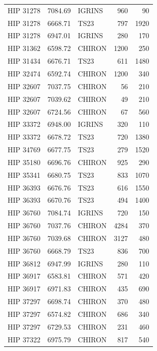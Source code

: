 {\begin{scriptsize}
\begin{longtable}{|l|rlrr|}
   HIP 31278 &  7084.69 &     IGRINS &      960 &    90 \\
   HIP 31278 &  6668.71 &       TS23 &      797 &  1920 \\
   HIP 31278 &  6947.01 &     IGRINS &      280 &   170 \\
   HIP 31362 &  6598.72 &     CHIRON &     1200 &   250 \\
   HIP 31434 &  6676.71 &       TS23 &      611 &  1480 \\
   HIP 32474 &  6592.74 &     CHIRON &     1200 &   340 \\
   HIP 32607 &  7037.75 &     CHIRON &       56 &   210 \\
   HIP 32607 &  7039.62 &     CHIRON &       49 &   210 \\
   HIP 32607 &  6724.56 &     CHIRON &       67 &   560 \\
   HIP 33372 &  6948.00 &     IGRINS &      320 &   110 \\
   HIP 33372 &  6678.72 &       TS23 &      720 &  1380 \\
   HIP 34769 &  6677.75 &       TS23 &      279 &  1520 \\
   HIP 35180 &  6696.76 &     CHIRON &      925 &   290 \\
   HIP 35341 &  6680.75 &       TS23 &      833 &  1070 \\
   HIP 36393 &  6676.76 &       TS23 &      616 &  1550 \\
   HIP 36393 &  6670.76 &       TS23 &      494 &  1400 \\
   HIP 36760 &  7084.74 &     IGRINS &      720 &   150 \\
   HIP 36760 &  7037.76 &     CHIRON &     4284 &   370 \\
   HIP 36760 &  7039.68 &     CHIRON &     3127 &   480 \\
   HIP 36760 &  6668.79 &       TS23 &      836 &   700 \\
   HIP 36812 &  6947.99 &     IGRINS &      280 &   110 \\
   HIP 36917 &  6583.81 &     CHIRON &      571 &   420 \\
   HIP 36917 &  6971.83 &     CHIRON &      435 &   690 \\
   HIP 37297 &  6698.74 &     CHIRON &      370 &   480 \\
   HIP 37297 &  6574.82 &     CHIRON &      686 &   340 \\
   HIP 37297 &  6729.53 &     CHIRON &      231 &   460 \\
   HIP 37322 &  6975.79 &     CHIRON &      817 &   540 \\

\end{longtable}
\end{scriptsize}}
